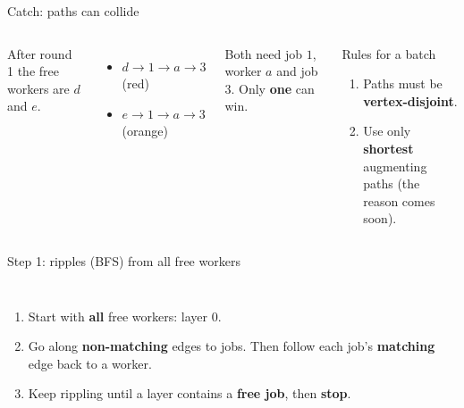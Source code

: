 \documentclass[aspectratio=169,11pt]{beamer}
\newcommand{\curspk}{A}
\newcommand{\layerA}{%
  \node[font=\footnotesize\bfseries,text=hkblue] at (0,1.75) {layer 0};
  \node[font=\footnotesize\bfseries,text=hkblue] at (2.2,1.75) {layer 1};
  \node[font=\footnotesize\bfseries,text=hkblue] at (4.4,1.75) {layer 2};
  \node[font=\footnotesize\bfseries,text=hkblue] at (6.6,1.75) {layer 3};
  \node[boy]  (Ld) at (0,0.8)  {$d$};
  \node[boy]  (Le) at (0,-0.8) {$e$};
  \node[girl] (L1) at (2.2,0.8)  {$1$};
  \node[girl] (L2) at (2.2,-0.8) {$2$};
  \node[boy]  (La) at (4.4,0.8)  {$a$};
  \node[boy]  (Lb) at (4.4,-0.8) {$b$};
  \node[girl] (L3) at (6.6,0.8)  {$3$};
  \node[girl] (L5) at (6.6,-0.8) {$5$};
}
\begin{document}
\renewcommand{\curspk}{B}
\begin{frame}{Catch: paths can collide}
\begin{columns}[c]
\centering
{}
After round 1 the free workers are $d$ and $e$.
\begin{itemize}\setlength\itemsep{4pt}
  \item $d\to1\to a\to3$ \quad\textcolor{hkred}{(red)}
  \item $e\to1\to a\to3$ \quad\textcolor{hkorange}{(orange)}
\end{itemize}
Both need job $1$, worker $a$ and job $3$. Only \textbf{one} can win.
\vspace{2mm}
\begin{block}{Rules for a batch}
\begin{enumerate}
\item Paths must be \textbf{vertex-disjoint}.
\item Use only \textbf{shortest} augmenting paths (the reason comes soon).
\end{enumerate}
\end{block}
\end{columns}
\end{frame}

\begin{frame}{Step 1: ripples (BFS) from all free workers}
\begin{columns}[c]
\centering
{}
\begin{enumerate}\setlength\itemsep{7pt}
  \item<1-> Start with \textbf{all} free workers: layer 0.
  \item<2-> Go along \textbf{non-matching} edges to jobs. Then follow each job's \textbf{matching} edge back to a worker.
  \item<3-> Keep rippling until a layer contains a \textbf{free job}, then \textbf{stop}.
\end{enumerate}
\end{columns}
\end{frame}
\end{document}

